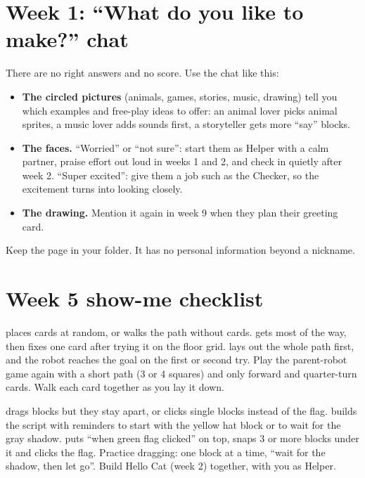 \section{Week 1: \enquote{What do you like to make?} chat}
There are no right answers and no score. Use the chat like this:
\begin{itemize}[itemsep=2pt]
  \item \textbf{The circled pictures} (animals, games, stories, music, drawing) tell you which
        examples and free-play ideas to offer: an animal lover picks animal sprites, a music lover
        adds sounds first, a storyteller gets more \enquote{say} blocks.
  \item \textbf{The faces.} \enquote{Worried} or \enquote{not sure}: start them as Helper with a calm
        partner, praise effort out loud in weeks 1 and 2, and check in quietly after week 2.
        \enquote{Super excited}: give them a job such as the Checker, so the excitement turns into looking closely.
  \item \textbf{The drawing.} Mention it again in week 9 when they plan their greeting card.
\end{itemize}
Keep the page in your folder. It has no personal information beyond a nickname.

\section{Week 5 show-me checklist}

  {places cards at random, or walks the path without cards.}
  {gets most of the way, then fixes one card after trying it on the floor grid.}
  {lays out the whole path first, and the robot reaches the goal on the first or second try.}
  {Play the parent-robot game again with a short path (3 or 4 squares) and only forward and quarter-turn cards. Walk each card together as you lay it down.}

  {drags blocks but they stay apart, or clicks single blocks instead of the flag.}
  {builds the script with reminders to start with the yellow hat block or to wait for the gray shadow.}
  {puts \enquote{when green flag clicked} on top, snaps 3 or more blocks under it and clicks the flag.}
  {Practice dragging: one block at a time, \enquote{wait for the shadow, then let go}. Build Hello Cat (week 2) together, with you as Helper.}

